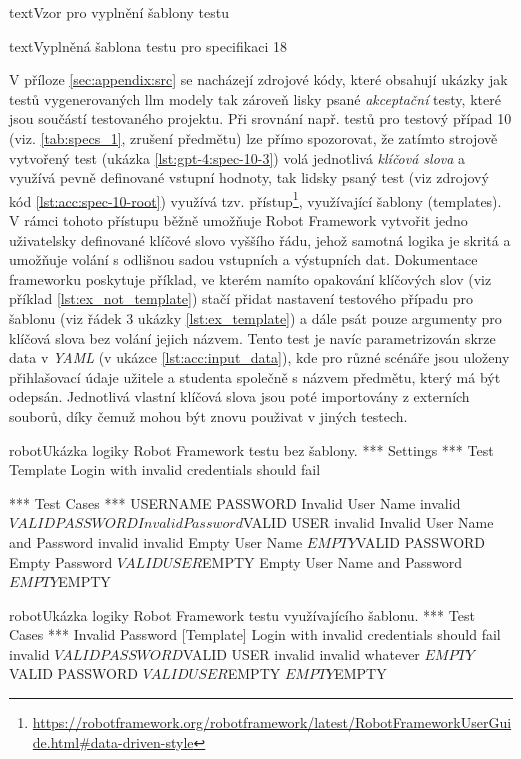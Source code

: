 \documentclass[czech, ma, kiv, he, iso690numb, pdf, viewonly]{fasthesis}
\begin{document}
\begin{code}{text}{Vzor pro vyplnění šablony testu \label{lst:template}}
{\begin{code}{text}{Vyplněná šablona testu pro specifikaci 18 \label{lst:spec18}}
{        V příloze \ref{sec:appendix:src} se nacházejí zdrojové kódy, které obsahují ukázky jak testů vygenerovaných \Gls{llm} modely tak zároveň lisky psané \textit{akceptační} testy, které jsou součástí testovaného projektu. Při srovnání např. testů pro testový případ 10 (viz. \ref{tab:specs_1}, zrušení předmětu) lze přímo spozorovat, že zatímto strojově vytvořený test (ukázka \ref{lst:gpt-4:spec-10-3}) volá jednotlivá \textit{klíčová slova} a využívá pevně definované vstupní hodnoty, tak lidsky psaný test (viz zdrojový kód \ref{lst:acc:spec-10-root}) využívá tzv.  přístup\footnote{\url{https://robotframework.org/robotframework/latest/RobotFrameworkUserGuide.html#data-driven-style}}, využívající šablony (templates). V rámci tohoto přístupu běžně umožňuje Robot Framework vytvořit jedno uživatelsky definované klíčové slovo vyššího řádu, jehož samotná logika je skritá a umožňuje volání s odlišnou sadou vstupních a výstupních dat. Dokumentace frameworku poskytuje příklad, ve kterém namíto opakování klíčových slov (viz příklad \ref{lst:ex_not_template}) stačí přidat nastavení testového případu pro šablonu (viz řádek 3 ukázky \ref{lst:ex_template}) a dále psát pouze argumenty pro klíčová slova bez volání jejich názvem. Tento test je navíc parametrizován skrze data v \textit{YAML} (v ukázce \ref{lst:acc:input_data}), kde pro různé scénáře jsou uloženy přihlašovací údaje užitele a studenta společně s názvem předmětu, který má být odepsán. Jednotlivá vlastní klíčová slova jsou poté importovány z externích souborů, díky čemuž mohou být znovu použivat v jiných testech.

        \begin{code}{robot}{Ukázka logiky Robot Framework testu bez šablony. \label{lst:ex_not_template}}
*** Settings ***
Test Template    Login with invalid credentials should fail

*** Test Cases ***                USERNAME         PASSWORD
Invalid User Name                 invalid          ${VALID PASSWORD}
Invalid Password                  ${VALID USER}    invalid
Invalid User Name and Password    invalid          invalid
Empty User Name                   ${EMPTY}         ${VALID PASSWORD}
Empty Password                    ${VALID USER}    ${EMPTY}
Empty User Name and Password      ${EMPTY}         ${EMPTY}\end{code}

        \begin{code}{robot}{Ukázka logiky Robot Framework testu využívajícího šablonu. \label{lst:ex_template}}
*** Test Cases ***
Invalid Password
    [Template]    Login with invalid credentials should fail
    invalid          ${VALID PASSWORD}
    ${VALID USER}    invalid
    invalid          whatever
    ${EMPTY}         ${VALID PASSWORD}
    ${VALID USER}    ${EMPTY}
    ${EMPTY}         ${EMPTY}\end{code}

}
\end{code}}
\end{code}
\end{document}
